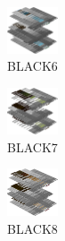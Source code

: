 \hspace{0.1cm}
\begin{minipage}[b]{0.15\linewidth}
\begin{figure}[H]                                                          
  \centering                                                             
  \begin{adjustbox}{width=1.5cm,center}                                   
  \includegraphics[width=1.5cm]{src/colorspace_colourflow/flows/colourflow_6-45.png}%
  \end{adjustbox}                                                        
\caption*{BLACK6}                                           
\end{figure}                                                               
\end{minipage}
\hspace{0.1cm}
\begin{minipage}[b]{0.15\linewidth}
\begin{figure}[H]                                                          
  \centering                                                             
  \begin{adjustbox}{width=1.5cm,center}                                   
  \includegraphics[width=1.5cm]{src/colorspace_colourflow/flows/colourflow_7-45.png}%
  \end{adjustbox}                                                        
\caption*{BLACK7}                                           
\end{figure}                                                               
\end{minipage}
\hspace{0.1cm}
\begin{minipage}[b]{0.15\linewidth}
\begin{figure}[H]                                                          
  \centering                                                             
  \begin{adjustbox}{width=1.5cm,center}                                   
  \includegraphics[width=1.5cm]{src/colorspace_colourflow/flows/colourflow_8-45.png}%
  \end{adjustbox}                                                        
\caption*{BLACK8}                                           
\end{figure}                                                               
\end{minipage}
